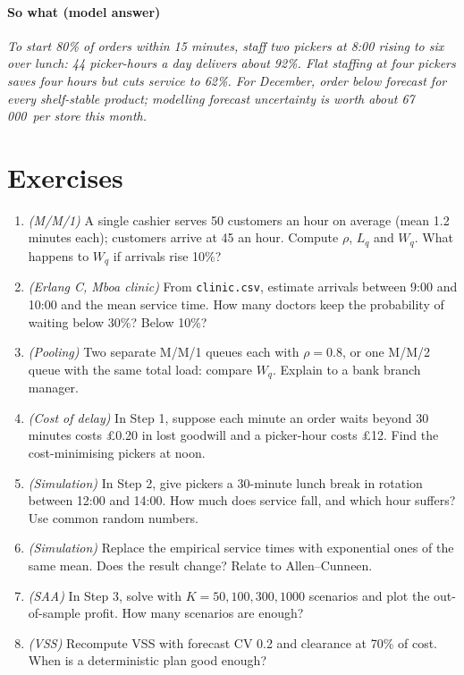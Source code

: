 \paragraph{So what (model answer)} \emph{To start 80\% of orders within 15 minutes, staff two pickers at 8:00 rising to
six over lunch: 44 picker-hours a day delivers about 92\%. Flat staffing at four pickers saves four hours but cuts
service to 62\%. For December, order below forecast for every shelf-stable product; modelling forecast uncertainty is
worth about 67\,000\xaf\ per store this month.}

\section{Exercises}
\begin{enumerate}[label=\textbf{6.\arabic*},leftmargin=2.4em]
\item \emph{(M/M/1)} A single cashier serves 50 customers an hour on average (mean 1.2 minutes each); customers arrive
at 45 an hour. Compute $\rho$, $L_q$ and $W_q$. What happens to $W_q$ if arrivals rise 10\%?
\item \emph{(Erlang C, Mboa clinic)} From \texttt{clinic.csv}, estimate arrivals between 9:00 and 10:00 and the mean
service time. How many doctors keep the probability of waiting below 30\%? Below 10\%?
\item \emph{(Pooling)} Two separate M/M/1 queues each with $\rho=0.8$, or one M/M/2 queue with the same total load:
compare $W_q$. Explain to a bank branch manager.
\item \emph{(Cost of delay)} In Step 1, suppose each minute an order waits beyond 30 minutes costs \pounds0.20 in lost
goodwill and a picker-hour costs \pounds12. Find the cost-minimising pickers at noon.
\item \emph{(Simulation)} In Step 2, give pickers a 30-minute lunch break in rotation between 12:00 and 14:00. How much
does service fall, and which hour suffers? Use common random numbers.
\item \emph{(Simulation)} Replace the empirical service times with exponential ones of the same mean. Does the result
change? Relate to Allen--Cunneen.
\item \emph{(SAA)} In Step 3, solve with $K=50,100,300,1000$ scenarios and plot the out-of-sample profit. How many
scenarios are enough?
\item \emph{(VSS)} Recompute VSS with forecast CV 0.2 and clearance at 70\% of cost. When is a deterministic plan good
enough?
\end{enumerate}

